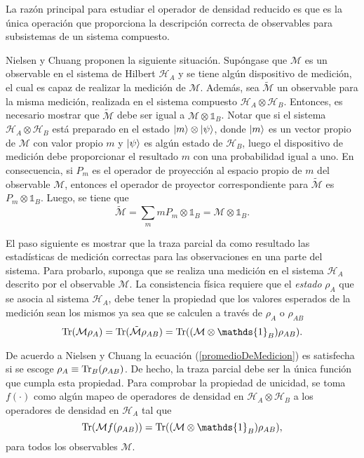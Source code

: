 La razón principal para estudiar el operador de densidad reducido es que es la única operación que proporciona la descripción correcta de observables para subsistemas de un sistema compuesto. 

Nielsen y Chuang {\cite{nielsen_chuang_2010}} proponen la siguiente situación.
Supóngase que $\mathcal{M}$ es un observable en el sistema de Hilbert
$\mathcal{H}_A$ y se tiene algún dispositivo de medición, el cual es capaz de
realizar la medición de $\mathcal{M}$. Además, sea $\tilde{\mathcal{M}}$ un observable para la misma medición, realizada en el sistema compuesto $\mathcal{H}_A\otimes
\mathcal{H}_B$. Entonces, es necesario mostrar que $\tilde{\mathcal{M}}$ debe
ser igual a $\mathcal{M}\otimes \mathds{1}_B$. Notar que si el sistema
$\mathcal{H}_A\otimes \mathcal{H}_B$ está preparado en el estado $|m \rangle
\otimes|\psi\rangle $, donde $|m\rangle $ es un vector propio de $\mathcal{M}$ con
valor propio $m$ y $|\psi\rangle$ es algún estado de $\mathcal{H}_B$, luego el
dispositivo de medición debe proporcionar  el resultado $m$ con una
probabilidad igual a uno.  En consecuencia, si $P_m$ es el operador de proyección al espacio propio de $m$ del observable $\mathcal{M}$, entonces el operador de proyector correspondiente para $\tilde{\mathcal{M}}$ es $P_m\otimes
\mathds{1}_B$. Luego, se tiene que \[\mathcal{\tilde{M}}=\sum_m mP_m\otimes
\mathds{1}_B=\mathcal{M}\otimes \mathds{1}_B.\]

El paso siguiente es mostrar que la traza parcial da como resultado las estadísticas de medición correctas para
las observaciones en una parte del sistema. Para probarlo, suponga que se realiza
una medición en el sistema $\mathcal{H}_A$ descrito por el observable
$\mathcal{M}$. La consistencia física requiere que el \textit{estado} $\rho_A$ que se asocia al sistema $\mathcal{H}_A$, debe tener la propiedad que los valores esperados de la medición sean los mismos ya sea que se calculen a través de $\rho_A$ o $\rho_{AB}$ {\cite{nielsen_chuang_2010}}
\begin{equation}\label{promedioDeMedicion}\tr(\mathcal{M}\rho_A)=\tr(\mathcal{\tilde{M}}\rho_{AB})=\tr((\mathcal{{M}}\otimes
\mathds{1}_B)\rho_{AB}).\end{equation} 

De acuerdo a Nielsen y Chuang {\cite{nielsen_chuang_2010}} la ecuación
({\ref{promedioDeMedicion}}) es satisfecha si se escoge $\rho_A\equiv {\rm Tr}_B(\rho
_{AB})$. De hecho, la traza parcial debe ser la única función que cumpla esta
propiedad. Para comprobar la propiedad de unicidad, se toma  $f(\cdot)$ como
algún mapeo de operadores de densidad en $\mathcal{H}_A\otimes \mathcal{H}_B$ a
los operadores de densidad en $\mathcal{H}_A$ tal que \[\tr(\mathcal{M}
f(\rho_{AB} )) = \tr((\mathcal{M}\otimes \mathds{1}_B )\rho_{AB} ),\] para
todos los observables $\mathcal{M}$. 

